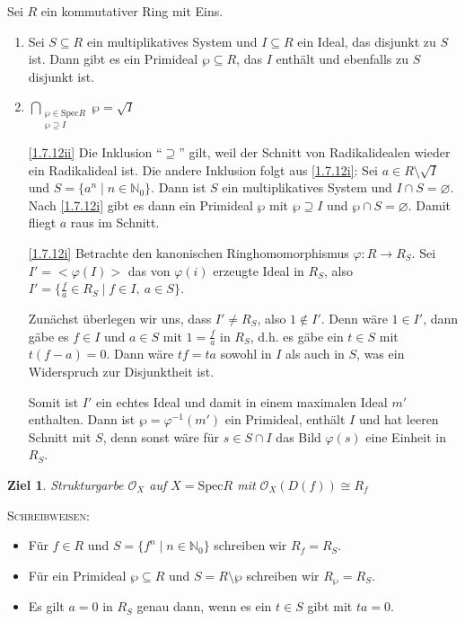 \documentclass[a4paper,12pt]{scrbook}
\makeatletter
\theoremstyle{blah}
\newtheorem*{ziel}{Ziel}
\theoremstyle{stz}
\renewcommand{\proofname}{Beweis}
\renewenvironment{proof}[1][\proofname]{\par
  \pushQED{\qed}%
  \normalfont \topsep6\p@\@plus6\p@\relax
  \trivlist
  \item[\hskip\labelsep
        \itshape
    #1\@addpunct{:}]\ignorespaces
}{%
  \popQED\endtrivlist\@endpefalse
}
\def\O{\mathcal{O}}
\newcommand{\Spec}{\mathrm{Spec}}
\newcommand{\ra}{\longrightarrow}
\renewcommand{\phi}{\varphi}
\newcommand{\leer}{\ensuremath{\varnothing}}
\newcommand{\set}[1]{\ensuremath{\mathbb{#1}}}
\newcommand{\N}{\set{N}}
\makeatother
\begin{document}
\begin{lem}\label{1.7.12}
  Sei $R$ ein kommutativer Ring mit Eins.
  \begin{enumerate}
  \item\label{1.7.12i} Sei $S\subseteq R$ ein multiplikatives System und $I\subseteq R$ ein Ideal, das disjunkt zu $S$ ist. Dann
    gibt es ein Primideal $\wp\subseteq R$, das $I$ enthält und ebenfalls zu $S$ disjunkt ist.
  \item\label{1.7.12ii} $\displaystyle\!\!\!\bigcap_{\substack{\wp\in\Spec R\\\wp\supseteq I}}\!\!\!\wp = \sqrt{I}$
  \end{enumerate}
\end{lem}
\begin{proof}
  \begin{enumerate}
  \item[\ref{1.7.12ii}] Die Inklusion \enquote{$\supseteq$} gilt, weil der Schnitt von Radikalidealen wieder ein Radikalideal
    ist. Die andere Inklusion folgt aus \ref{1.7.12i}: Sei $a\in R\setminus\sqrt{I}$ und $S=\{a^n\mid n\in\N_0\}$. Dann ist $S$
    ein multiplikatives System und $I\cap S=\leer$. Nach \ref{1.7.12i} gibt es dann ein Primideal $\wp$ mit $\wp\supseteq I$ und
    $\wp\cap S=\leer$. Damit fliegt $a$ raus im Schnitt.
  \item[\ref{1.7.12i}] Betrachte den kanonischen Ringhomomorphismus $\phi\colon R\ra R_S$. Sei $I'=<\phi(I)>$ das von $\phi(i)$
    erzeugte Ideal in $R_S$, also $I'=\{\frac{f}{a}\in R_S\mid f\in I,\ a\in S\}$.

    Zunächst überlegen wir uns, dass $I'\neq R_S$, also $1\notin I'$. Denn wäre $1\in I'$, dann gäbe es $f\in I$ und $a\in S$
    mit $1=\frac{f}{a}$ in $R_S$, d.h. es gäbe ein $t\in S$ mit $t(f-a)=0$. Dann wäre $tf=ta$ sowohl in $I$ als auch in $S$, was
    ein Widerspruch zur Disjunktheit ist.

    Somit ist $I'$ ein echtes Ideal und damit in einem maximalen Ideal $m'$ enthalten. Dann ist $\wp=\phi^{-1}(m')$ ein
    Primideal, enthält $I$ und hat leeren Schnitt mit $S$, denn sonst wäre für $s\in S\cap I$ das Bild $\phi(s)$ eine Einheit in
    $R_S$.
  \end{enumerate}
\end{proof}

\begin{ziel}
  Strukturgarbe $\O_X$ auf $X=\Spec R$ mit $\O_X(D(f))\cong R_f$
\end{ziel}

\textsc{Schreibweisen}:
\begin{itemize}
\item Für $f\in R$ und $S=\{f^n\mid n\in\N_0\}$ schreiben wir $R_f=R_S$.
\item Für ein Primideal $\wp\subseteq R$ und $S=R\setminus\wp$ schreiben wir $R_\wp=R_S$.
\item Es gilt $a=0$ in $R_S$ genau dann, wenn es ein $t\in S$ gibt mit $ta=0$.
\end{itemize}
\end{document}

